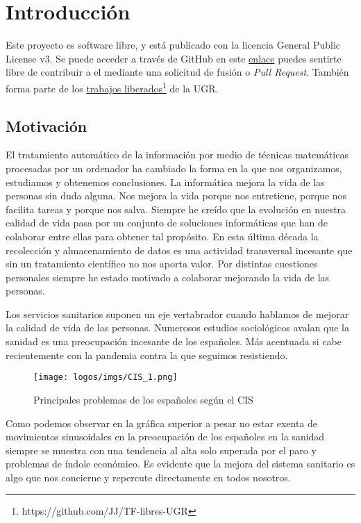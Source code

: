 \chapter{Introducción}
Este proyecto es software libre, y está publicado con la licencia \cite{gplv3} General Public License v3.
Se puede acceder a través de GitHub en este \href{https://github.com/pablojjimenez/TFG}{enlace} puedes sentirte libre de contribuir a 
el mediante una solicitud de fusión o \textit{Pull Request}. También forma parte de los \href{https://github.com/JJ/TF-libres-UGR}{trabajos liberados}\footnote{https://github.com/JJ/TF-libres-UGR} de la UGR.

\section{Motivación} 
El tratamiento automático de la información por medio de técnicas matemáticas procesadas por un ordenador 
ha cambiado la forma en la que nos organizamos, estudiamos y obtenemos conclusiones. La informática mejora 
la vida de las personas sin duda alguna. Nos mejora la vida porque nos entretiene, porque nos facilita 
tareas y porque nos salva. Siempre he creído que la evolución en nuestra calidad de vida pasa por un 
conjunto de soluciones informáticas que han de colaborar entre ellas para obtener tal propósito. 
En esta última década la recolección y almacenamiento de datos es una actividad transversal incesante 
que sin un tratamiento científico no nos aporta valor. Por distintas cuestiones personales siempre he 
estado motivado a colaborar mejorando la vida de las personas. 

Los servicios sanitarios suponen un eje vertabrador cuando hablamos de mejorar la calidad 
de vida de las personas. Numerosos estudios sociológicos avalan que la sanidad es una 
preocupación incesante de los españoles. Más acentuada si cabe recientemente con la 
pandemia contra la que seguimos resistiendo.

\begin{figure}[]
	\centering	
	\texttt{[image: logos/imgs/CIS\_1.png]}
	\caption{ \cite{rtve-cis}  Principales problemas de los españoles según el CIS }
    \label{fig:worst_f_value}
\end{figure}

Como podemos observar en la gráfica superior a pesar no estar exenta de movimientos sinusoidales 
en la preocupación de los españoles en la sanidad siempre se muestra con una tendencia al alta 
solo superada por el paro y problemas de índole económico. 
Es evidente que la mejora del sistema sanitario es algo que nos concierne y repercute 
directamente en todos nosotros.

